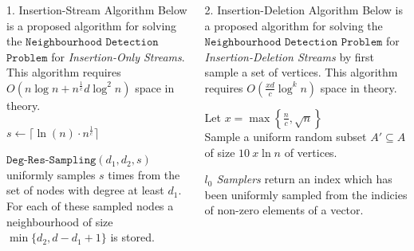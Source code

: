 \documentclass[ %
                    author={Dominic Hutchinson},
                supervisor={Dr. Christian Konrad},
                    degree={MEng Maths  and Computer Science},
                     title={Implementing and Evaluating Space Efficient Algorithms for Detecting Large Neighbourhoods in Graph Streams},
                  subtitle={},
                      type={Research},
                      year={2020} ]{poster}
\begin{document}
\begin{frame}{}
\begin{columns}[t]
  \begin{column}{0.422\linewidth}
  \begin{block}{\Large 1. Insertion-Stream Algorithm}
Below is a proposed algorithm for solving the $\mathtt{Neighbourhood}$ $\mathtt{Detection}$ $\mathtt{Problem}$ for \textit{Insertion-Only Streams}. This algorithm requires $O(n\log n+n^{\frac1c}d\log^2n)$ space in theory.
\vspace{.5cm}\\
\begin{algorithm}[H]
\caption{One-pass $c$-approximation Insertion-Only Streaming Algorithm for $\mathtt{Neighbourhood\ Detection}$}
$s\leftarrow\lceil\ln(n)\cdot n^{\frac1c}\rceil$\\
\end{algorithm}
\vspace{.5cm}
	$\mathtt{Deg}\mbox{-}\mathtt{Res}\mbox{-}\mathtt{Sampling}(d_1,d_2,s)$ uniformly samples $s$ times from the set of nodes with degree at least $d_1$. For each of these sampled nodes a neighbourhood of size $\min\{d_2,d-d_1+1\}$ is stored.
  \end{block}
  \end{column}

  \begin{column}{0.422\linewidth}
  \begin{block}{\Large 2. Insertion-Deletion Algorithm}
Below is a proposed algorithm for solving the $\mathtt{Neighbourhood}$ $\mathtt{Detection}$ $\mathtt{Problem}$ for \textit{Insertion-Deletion Streams} by first sample a set of vertices. This algorithm requires $O(\frac{xd}c\log^kn)$ space in theory.
\vspace{.5cm}\\
\begin{algorithm}[H]
\caption{One-pass $c$-approximation Insertion-Deletion Streaming Algorithm for $\mathtt{Neighbourhood\ Detection}$. }
Let $x=\max\left\{\frac{n}{c},\sqrt{n}\right\}$\\
Sample a uniform random subset $A'\subseteq A$ of size $10\ x\ln n$ of vertices.\\
\end{algorithm}
\vspace{.5cm}
\textit{$l_0$ Samplers} return an index which has been uniformly sampled from the indicies of non-zero elements of a vector.
  \end{block}
  \end{column}
\end{columns}


\end{frame}
\end{document}
